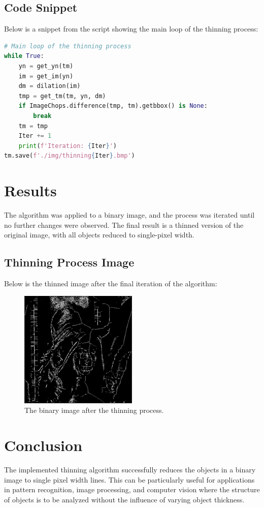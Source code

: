 \documentclass{article}
\begin{document}
\subsection{Code Snippet}
Below is a snippet from the script showing the main loop of the thinning process:

\begin{lstlisting}[language=Python]
# Main loop of the thinning process
while True:
    yn = get_yn(tm)
    im = get_im(yn)
    dm = dilation(im)
    tmp = get_tm(tm, yn, dm)
    if ImageChops.difference(tmp, tm).getbbox() is None:
        break
    tm = tmp
    Iter += 1
    print(f'Iteration: {Iter}')
tm.save(f'./img/thinning{Iter}.bmp')
\end{lstlisting}

\section{Results}
The algorithm was applied to a binary image, and the process was iterated until no further changes were observed. The final result is a thinned version of the original image, with all objects reduced to single-pixel width.

\subsection{Thinning Process Image}
Below is the thinned image after the final iteration of the algorithm:

\begin{figure}[h]
    \centering
    \includegraphics[width=0.5\textwidth]{./img/thinningIter.png}
    \caption{The binary image after the thinning process.}
    \label{fig:thinningIter}
\end{figure}

\section{Conclusion}
The implemented thinning algorithm successfully reduces the objects in a binary image to single pixel width lines. This can be particularly useful for applications in pattern recognition, image processing, and computer vision where the structure of objects is to be analyzed without the influence of varying object thickness.
\end{document}
